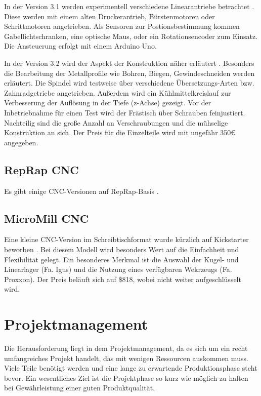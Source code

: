 \documentclass[
	a4paper,
	smallheadings,
	german,
	]
	{scrreprt}
\begin{document}
In der Version 3.1 werden experimentell verschiedene Linearantriebe betrachtet \autocite{:Heinz_CNC_3.1}.
Diese werden mit einem alten Druckerantrieb, Bürstenmotoren oder Schrittmotoren angetrieben.
Als Sensoren zur Postionsbestimmung kommen Gabellichtschranken, eine optische Maus, oder ein Rotationsencoder zum Einsatz.
Die Ansteuerung erfolgt mit einem Arduino Uno.

In der Version 3.2 wird der Aspekt der Konstruktion näher erläutert \autocite{:Heinz_CNC_3.2}.
Besonders die Bearbeitung der Metallprofile wie Bohren, Biegen, Gewindeschneiden werden erläutert.
Die Spindel wird testweise über verschiedene Übersetzungs-Arten bzw. Zahnradgetriebe angetrieben.
Außerdem wird ein Kühlmittelkreislauf zur Verbesserung der Auflösung in der Tiefe (z-Achse) gezeigt. 
Vor der Inbetriebnahme für einen Test wird der Frästisch über Schrauben feinjustiert.
Nachteilig sind die große Anzahl an Verschraubungen und die mühselige Konstruktion an sich.
Der Preis für die Einzelteile wird mit ungefähr 350€ angegeben. 

\section{RepRap CNC}
Es gibt einige CNC-Versionen auf RepRap-Basis \autocite{:02}.

\section{MicroMill CNC}
Eine kleine CNC-Version im Schreibtischformat wurde kürzlich auf Kickstarter beworben \autocite{:kickstarter}.
Bei diesem Modell wird besonders Wert auf die Einfachheit und Flexibilität gelegt.
Ein besonderes Merkmal ist die Auswahl der Kugel- und Linearlager (Fa. Igus) und die Nutzung eines verfügbaren Wekrzeugs (Fa. Proxxon). 
Der Preis beläuft sich auf \$818, wobei nicht weiter aufgeschlüsselt wird. 

\chapter{Projektmanagement}

Die Herausforderung liegt in dem Projektmanagement, da es sich um ein recht umfangreiches Projekt handelt, das mit wenigen Ressourcen auskommen muss.
Viele Teile benötigt werden und eine lange zu erwartende Produktionsphase steht bevor.
Ein wesentliches Ziel ist die Projektphase so kurz wie möglich zu halten bei Gewährleistung einer guten Produktqualität.
\end{document}
